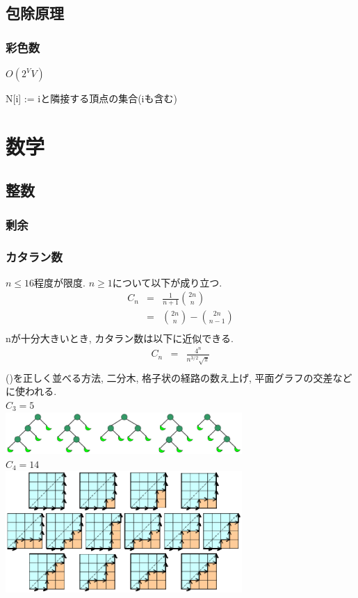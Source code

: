 \documentclass[9pt,twocolumn,a4paper,landscape]{extarticle}
\begin{document}
\subsection{包除原理}
\subsubsection{彩色数}
$O(2^VV)$\par
N[i] := iと隣接する頂点の集合(iも含む)\par



\section{数学}
\subsection{整数}
\subsubsection{剰余}


\subsubsection{カタラン数}
$n\leq 16$程度が限度. $n\geq 1$について以下が成り立つ.
\begin{eqnarray*}
  C_n &=& \frac{1}{n+1}\binom{2n}{n}\\
      &=& \binom{2n}{n}-\binom{2n}{n-1}\\
\end{eqnarray*}
nが十分大きいとき, カタラン数は以下に近似できる.
\begin{eqnarray*}
  C_n &=& \frac{4^n}{n^{3/2}\sqrt{\pi}}\\
\end{eqnarray*}
()を正しく並べる方法, 二分木, 格子状の経路の数え上げ, 平面グラフの交差などに使われる.\\
$C_3=5$\\
\includegraphics[width=9cm, clip]{img/Catalan_tree.eps}\\
$C_4=14$\\
\includegraphics[width=9cm, clip]{img/Catalan_graph.eps}\\
\end{document}
